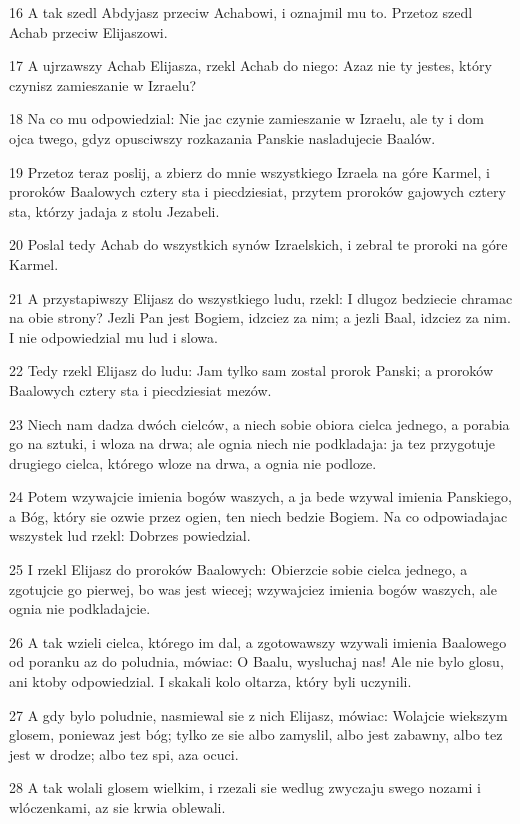 \par 16 A tak szedl Abdyjasz przeciw Achabowi, i oznajmil mu to. Przetoz szedl Achab przeciw Elijaszowi.
\par 17 A ujrzawszy Achab Elijasza, rzekl Achab do niego: Azaz nie ty jestes, który czynisz zamieszanie w Izraelu?
\par 18 Na co mu odpowiedzial: Nie jac czynie zamieszanie w Izraelu, ale ty i dom ojca twego, gdyz opusciwszy rozkazania Panskie nasladujecie Baalów.
\par 19 Przetoz teraz poslij, a zbierz do mnie wszystkiego Izraela na góre Karmel, i proroków Baalowych cztery sta i piecdziesiat, przytem proroków gajowych cztery sta, którzy jadaja z stolu Jezabeli.
\par 20 Poslal tedy Achab do wszystkich synów Izraelskich, i zebral te proroki na góre Karmel.
\par 21 A przystapiwszy Elijasz do wszystkiego ludu, rzekl: I dlugoz bedziecie chramac na obie strony? Jezli Pan jest Bogiem, idzciez za nim; a jezli Baal, idzciez za nim. I nie odpowiedzial mu lud i slowa.
\par 22 Tedy rzekl Elijasz do ludu: Jam tylko sam zostal prorok Panski; a proroków Baalowych cztery sta i piecdziesiat mezów.
\par 23 Niech nam dadza dwóch cielców, a niech sobie obiora cielca jednego, a porabia go na sztuki, i wloza na drwa; ale ognia niech nie podkladaja: ja tez przygotuje drugiego cielca, którego wloze na drwa, a ognia nie podloze.
\par 24 Potem wzywajcie imienia bogów waszych, a ja bede wzywal imienia Panskiego, a Bóg, który sie ozwie przez ogien, ten niech bedzie Bogiem. Na co odpowiadajac wszystek lud rzekl: Dobrzes powiedzial.
\par 25 I rzekl Elijasz do proroków Baalowych: Obierzcie sobie cielca jednego, a zgotujcie go pierwej, bo was jest wiecej; wzywajciez imienia bogów waszych, ale ognia nie podkladajcie.
\par 26 A tak wzieli cielca, którego im dal, a zgotowawszy wzywali imienia Baalowego od poranku az do poludnia, mówiac: O Baalu, wysluchaj nas! Ale nie bylo glosu, ani ktoby odpowiedzial. I skakali kolo oltarza, który byli uczynili.
\par 27 A gdy bylo poludnie, nasmiewal sie z nich Elijasz, mówiac: Wolajcie wiekszym glosem, poniewaz jest bóg; tylko ze sie albo zamyslil, albo jest zabawny, albo tez jest w drodze; albo tez spi, aza ocuci.
\par 28 A tak wolali glosem wielkim, i rzezali sie wedlug zwyczaju swego nozami i wlóczenkami, az sie krwia oblewali.
